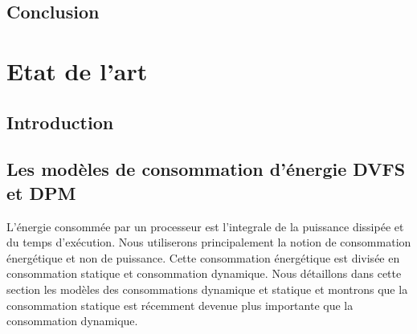 \vspace{1cm}


\section{Conclusion}
\vspace{-1cm}
\chapter{Etat de l'art}
\minitoc
\section{Introduction}
\section{Les modèles de consommation d'énergie DVFS et DPM}
\vspace{-1cm}
L’énergie consommée par un processeur est l'integrale de la puissance dissipée et du temps d’exécution. Nous utiliserons principalement la notion de consommation énergétique et non de puissance. Cette consommation énergétique est divisée en consommation statique et consommation dynamique. Nous détaillons dans cette section les modèles des consommations dynamique et statique et montrons que la consommation statique est récemment devenue plus importante que la consommation dynamique.

